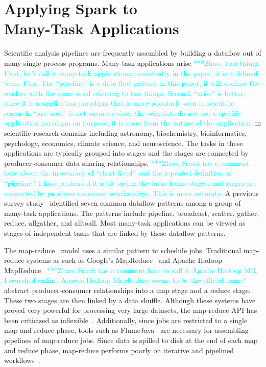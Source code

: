 \documentclass[conference]{IEEEtran}
\newcommand{\zhaonote}[1]{{\textcolor{cyan}    { ***Zhao:      #1 }}}
\newcommand{\zhaonote}[1]{}
\begin{document}
\section{Applying Spark to \\ Many-Task Applications}
\label{sec:Capability}

Scientific analysis pipelines are frequently assembled by building a dataflow out of many
single-process programs. Many-task applications arise
\zhaonote{Two things. First, let's call it many-task applications consistently in the paper, it is a defined-term. Plus, 
The ``pipeline'' is a data flow pattern in this paper, it will confuse the readers with the same word referring to two things.
Second, ``arise'' is better, since it is a application paradigm that is more popularly seen in scientific research.
``are used'' is not accurate since the scientists do not use a specific application paradigm on purpose, it is more
from the nature of the application.}
 in scientific research
domains including astronomy, biochemistry, bioinformatics, psychology, economics, climate science,
and neuroscience. The tasks in these applications are typically grouped into stages and the stages are connected by
producer-consumer data sharing relationships. 
\zhaonote{Frank has a comment here about the inaccuracy of ``short-lived'' and the repeated definition of ``pipeline''. I have rephrased it a bit saying the tasks forms stages, and stages are connected
by producer-consumer relationships. This is more accurate.}
A previous survey study~\cite{katz11} identified
seven common dataflow patterns among a group of many-task applications. The patterns
include pipeline, broadcast, scatter, gather,
reduce, allgather, and alltoall. Most many-task applications
can be viewed as stages of independent tasks that are linked by these dataflow patterns.

The map-reduce~\cite{dean04} model uses a similar pattern to schedule jobs. Traditional map-reduce
systems as such as Google's MapReduce~\cite{dean04} and Apache Hadoop MapReduce~\cite{HADOOP} 
\zhaonote{Frank has a comment here to call it Apache Hadoop MR, I searched online, Apache Hadoop MapReduce
seems to be the official name?}
abstract producer-consumer relationships into a map stage and a reduce stage. These two stages are then
linked by a data shuffle. Although these systems have proved very powerful for processing very
large datasets, the map-reduce API has been criticized as inflexible~\cite{dewitt08}.
Additionally, since jobs are restricted to a single map and reduce phase, tools such as
FlumeJava~\cite{chambers10} are necessary for assembling pipelines of map-reduce jobs. Since
data is spilled to disk at the end of each map and reduce phase, map-reduce performs poorly
on iterative and pipelined workflows~\cite{zaharia12}.
\end{document}
